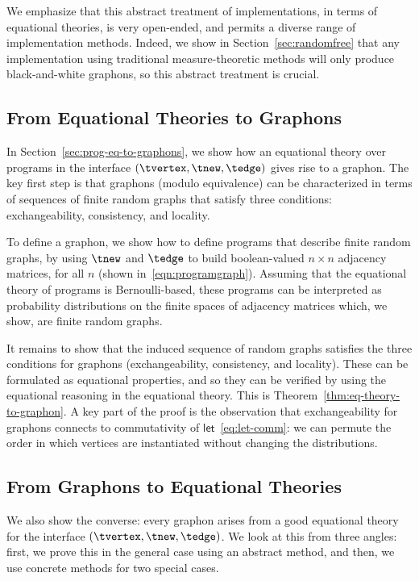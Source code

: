 We emphasize that this abstract treatment of implementations, in terms
of equational theories, is very open-ended, and permits a diverse range of implementation
methods. Indeed, we show in Section~\ref{sec:randomfree} that any
implementation using traditional measure-theoretic methods will
only produce black-and-white graphons, so this abstract treatment is crucial. 

\subsection{From Equational Theories to Graphons}
\label{sec:intro:equations-to-graphons}


In Section~\ref{sec:prog-eq-to-graphons}, we show how an equational
theory over programs in the interface $(\tvertex,\tnew,\tedge)$ gives rise to  a graphon.
The key first step is that graphons (modulo equivalence) can be
characterized in terms of sequences of finite random graphs that
satisfy three conditions: exchangeability, consistency, and locality.

To define a graphon, we show how to define programs that describe finite random graphs, by using
$\tnew$ and $\tedge$ to build boolean-valued $n\times n$ adjacency
matrices, for all $n$ (shown in~\eqref{eqn:programgraph}).
Assuming that the equational theory of programs is Bernoulli-based,
these programs can be interpreted as probability distributions on the
finite spaces of adjacency matrices which, we show, are finite random graphs.  

It remains to show that the induced sequence of random graphs
satisfies the three conditions for graphons (exchangeability,
consistency, and locality). These can be formulated as equational
properties, and so they can be verified by using the equational
reasoning in the equational theory. This is Theorem~\ref{thm:eq-theory-to-graphon}.
A key part of the proof is the observation that exchangeability for graphons
connects to commutativity of $\mathsf{let}$~\eqref{eq:let-comm}: we can permute the order in which
vertices are instantiated without changing the distributions. 


\subsection{From Graphons to Equational Theories}
\label{sec:intro:graphons-to-equations}
We also show the converse: every graphon arises from a good
equational theory for the interface $(\tvertex,\tnew,\tedge)$.
We look at this from three angles: first, we prove this in the general
case using an abstract method, and then, we use concrete methods for
two special cases.

